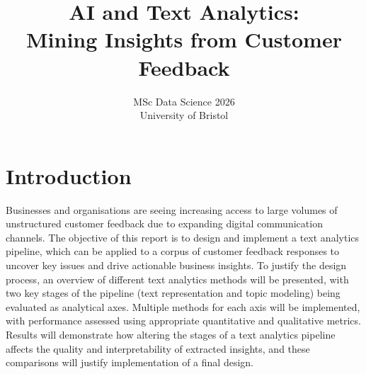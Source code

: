 \documentclass[11pt]{article}
\title{AI and Text Analytics:\\Mining Insights from Customer Feedback}
\author{MSc Data Science 2026\\ University of Bristol}
\begin{document}
\maketitle
\begin{abstract}

\end{abstract}

\section{Introduction}
Businesses and organisations are seeing increasing access to large volumes of unstructured customer feedback due to expanding digital communication channels. The objective of this report is to design and implement a text analytics pipeline, which can be applied to a corpus of customer feedback responses to uncover key issues and drive actionable business insights. To justify the design process, an overview of different text analytics methods will be presented, with two key stages of the pipeline (text representation and topic modeling) being evaluated as analytical axes. Multiple methods for each axis will be implemented, with performance assessed using appropriate quantitative and qualitative metrics. Results  will demonstrate how altering the stages of a text analytics pipeline affects the quality and interpretability of extracted insights, and these comparisons will justify implementation of a final design.
\end{document}
